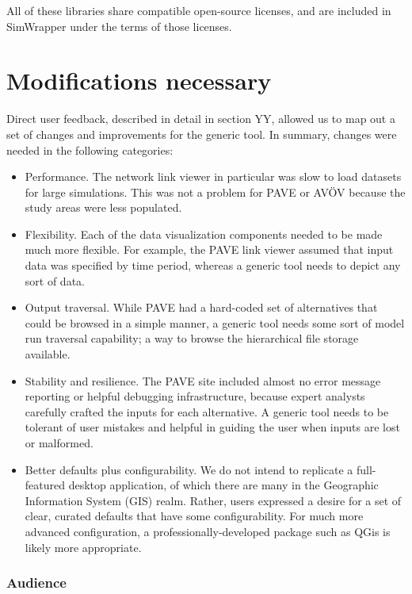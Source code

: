 All of these libraries share compatible open-source licenses, and are
included in SimWrapper under the terms of those licenses.

\hypertarget{modifications-necessary}{%
\section{Modifications necessary}\label{modifications-necessary}}

Direct user feedback, described in detail in section YY, allowed us to
map out a set of changes and improvements for the generic tool. In
summary, changes were needed in the following categories:

\begin{itemize}
\item
  Performance. The network link viewer in particular was slow to load
  datasets for large simulations. This was not a problem for PAVE or
  AVÖV because the study areas were less populated.
\item
  Flexibility. Each of the data visualization components needed to be
  made much more flexible. For example, the PAVE link viewer assumed
  that input data was specified by time period, whereas a generic tool
  needs to depict any sort of data.
\item
  Output traversal. While PAVE had a hard-coded set of alternatives that
  could be browsed in a simple manner, a generic tool needs some sort of
  model run traversal capability; a way to browse the hierarchical file
  storage available.
\item
  Stability and resilience. The PAVE site included almost no error
  message reporting or helpful debugging infrastructure, because expert
  analysts carefully crafted the inputs for each alternative. A generic
  tool needs to be tolerant of user mistakes and helpful in guiding the
  user when inputs are lost or malformed.
\item
  Better defaults plus configurability. We do not intend to replicate a
  full-featured desktop application, of which there are many in the
  Geographic Information System (GIS) realm. Rather, users expressed a
  desire for a set of clear, curated defaults that have some
  configurability. For much more advanced configuration, a
  professionally-developed package such as QGis is likely more
  appropriate.
\end{itemize}

\hypertarget{audience}{%
\subsubsection{Audience}\label{audience}}


